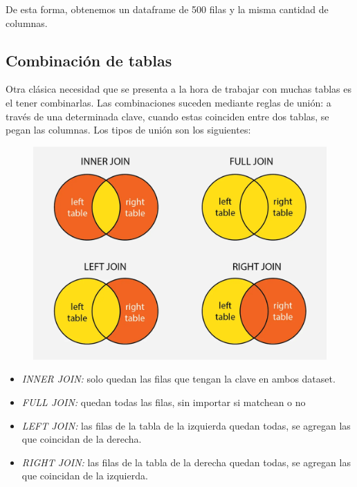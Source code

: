 \documentclass[
  letterpaper,
  DIV=11,
  numbers=noendperiod]{scrreprt}
\begin{document}
De esta forma, obtenemos un dataframe de 500 filas y la misma cantidad
de columnas.

\hypertarget{combinaciuxf3n-de-tablas}{%
\subsection{Combinación de tablas}\label{combinaciuxf3n-de-tablas}}

Otra clásica necesidad que se presenta a la hora de trabajar con muchas
tablas es el tener combinarlas. Las combinaciones suceden mediante
reglas de unión: a través de una determinada clave, cuando estas
coinciden entre dos tablas, se pegan las columnas. Los tipos de unión
son los siguientes:

\begin{figure}

{\centering \includegraphics{chapters/images/joins.webp}

}

\end{figure}

\begin{itemize}
\item
  \emph{INNER JOIN:} solo quedan las filas que tengan la clave en ambos
  dataset.
\item
  \emph{FULL JOIN:} quedan todas las filas, sin importar si matchean o
  no
\item
  \emph{LEFT JOIN:} las filas de la tabla de la izquierda quedan todas,
  se agregan las que coincidan de la derecha.
\item
  \emph{RIGHT JOIN:} las filas de la tabla de la derecha quedan todas,
  se agregan las que coincidan de la izquierda.
\end{itemize}
\end{document}
